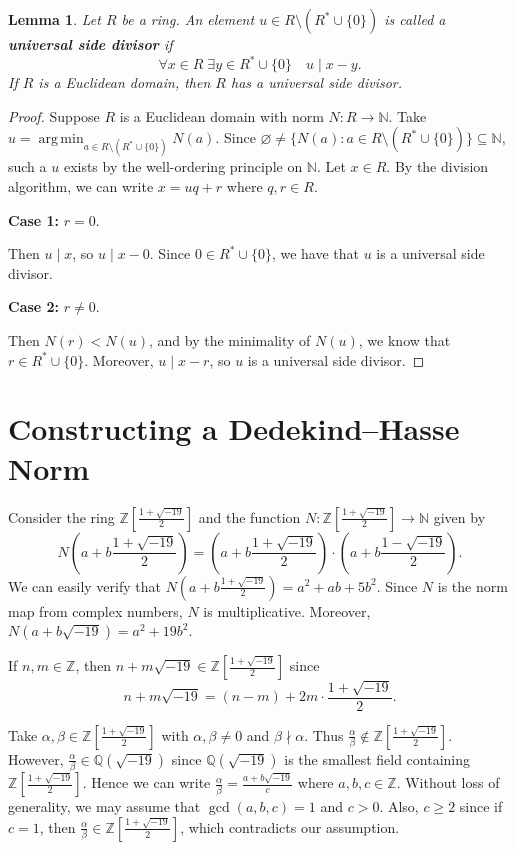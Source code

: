 \documentclass[a4paper,12pt]{report}
\newtheorem{lemma}{Lemma}
\newcommand{\argmin}{\operatorname*{arg\,min}}
\begin{document}
\begin{lemma}\label{lem:usd}
    Let $R$ be a ring. An element $u\in R\setminus (R^*\cup\{0\})$ is called a \textbf{universal side divisor} if
    \[
        \forall x\in R\;\exists y\in R^*\cup\{0\}\quad u\mid x-y.
    \]
    If $R$ is a Euclidean domain, then $R$ has a universal side divisor. 
\end{lemma}
\begin{proof}
    Suppose $R$ is a Euclidean domain with norm $N:R\to\mathbb{N}$. Take $u = \displaystyle\argmin_{a \in R \setminus (R^* \cup \{0\})} N(a)$. Since $\varnothing\neq\{N(a):a\in R\setminus (R^*\cup\{0\})\}\subseteq \mathbb{N}$, such a $u$ exists by the well-ordering principle on $\mathbb{N}$. Let $x\in R$. By the division algorithm, we can write $x=uq+r$ where $q,r\in R$.
    
    \medskip
    \noindent\textbf{Case 1:} $r=0$.
    
    Then $u\mid x$, so $u\mid x-0$. Since $0\in R^*\cup\{0\}$, we have that $u$ is a universal side divisor.
    
    \medskip
    \noindent\textbf{Case 2:} $r\neq 0$.
    
    Then $N(r)<N(u)$, and by the minimality of $N(u)$, we know that $r\in R^*\cup\{0\}$. Moreover, $u\mid x-r$, so $u$ is a universal side divisor.
\end{proof}

\section*{Constructing a Dedekind--Hasse Norm}

Consider the ring $\mathbb{Z}\left[\frac{1+\sqrt{-19}}{2}\right]$ and the function $N:\mathbb{Z}\left[\frac{1+\sqrt{-19}}{2}\right]\to\mathbb{N}$ given by
\[
    N\left(a+b\frac{1+\sqrt{-19}}{2}\right)=\left(a+b\frac{1+\sqrt{-19}}{2}\right)\cdot\left(a+b\frac{1-\sqrt{-19}}{2}\right).
\]
We can easily verify that $N\left(a+b\frac{1+\sqrt{-19}}{2}\right)=a^2+ab+5b^2$. Since $N$ is the norm map from complex numbers, $N$ is multiplicative. Moreover, $N(a+b\sqrt{-19})=a^2+19b^2$. 

If $n,m\in\mathbb{Z}$, then $n+m\sqrt{-19}\in\mathbb{Z}\left[\frac{1+\sqrt{-19}}{2}\right]$ since 
\[
n+m\sqrt{-19}=(n-m)+2m\cdot \frac{1+\sqrt{-19}}{2}.
\]

Take $\alpha,\beta\in \mathbb{Z}\left[\frac{1+\sqrt{-19}}{2}\right]$ with $\alpha,\beta\neq 0$ and $\beta\nmid\alpha$. Thus $\frac{\alpha}{\beta}\notin\mathbb{Z}\left[\frac{1+\sqrt{-19}}{2}\right]$. However, $\frac{\alpha}{\beta}\in\mathbb{Q}(\sqrt{-19})$ since $\mathbb{Q}(\sqrt{-19})$ is the smallest field containing $\mathbb{Z}\left[\frac{1+\sqrt{-19}}{2}\right]$. Hence we can write $\frac{\alpha}{\beta}=\frac{a+b\sqrt{-19}}{c}$ where $a,b,c\in\mathbb{Z}$. Without loss of generality, we may assume that $\gcd(a,b,c)=1$ and $c>0$. Also, $c\ge 2$ since if $c=1$, then $\frac{\alpha}{\beta}\in\mathbb{Z}\left[\frac{1+\sqrt{-19}}{2}\right]$, which contradicts our assumption. 
\end{document}
